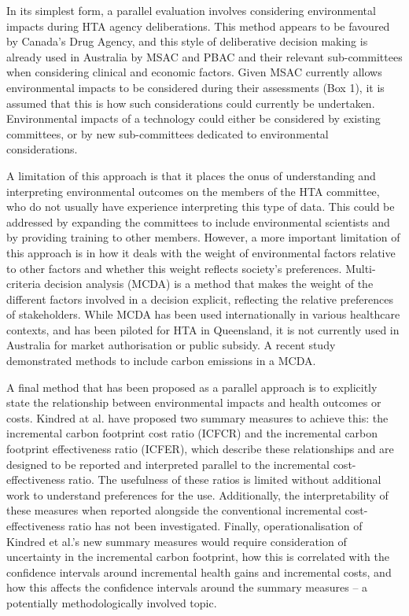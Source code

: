 \begin{refsection}
In its simplest form, a parallel evaluation involves considering environmental impacts during HTA agency deliberations. This method appears to be favoured by Canada’s Drug Agency,\cite{greenwood_dufour_how_2022} and this style of deliberative decision making is already used in Australia by MSAC and PBAC and their relevant sub-committees when considering clinical and economic factors. Given MSAC currently allows environmental impacts to be considered during their assessments (Box 1), it is assumed that this is how such considerations could currently be undertaken. Environmental impacts of a technology could either be considered by existing committees, or by new sub-committees dedicated to environmental considerations.

A limitation of this approach is that it places the onus of understanding and interpreting environmental outcomes on the members of the HTA committee, who do not usually have experience interpreting this type of data. This could be addressed by expanding the committees to include environmental scientists and by providing training to other members. However, a more important limitation of this approach is in how it deals with the weight of environmental factors relative to other factors and whether this weight reflects society’s preferences. Multi-criteria decision analysis (MCDA) is a method that makes the weight of the different factors involved in a decision explicit, reflecting the relative preferences of stakeholders. While MCDA has been used internationally in various healthcare contexts,\cite{thokala_multiple_2016, marsh_multiple_2016} and has been piloted for HTA in Queensland,\cite{howard_multicriteria_2018} it is not currently used in Australia for market authorisation or public subsidy. A recent study demonstrated methods to include carbon emissions in a MCDA.\cite{kingma_exploring_2025}

A final method that has been proposed as a parallel approach is to explicitly state the relationship between environmental impacts and health outcomes or costs.\cite{kindred_exploratory_2024} Kindred at al. have proposed two summary measures to achieve this: the incremental carbon footprint cost ratio (ICFCR) and the incremental carbon footprint effectiveness ratio (ICFER), which describe these relationships and are designed to be reported and interpreted parallel to the incremental cost-effectiveness ratio.\cite{kindred_exploratory_2024} The usefulness of these ratios is limited without additional work to understand preferences for the use. Additionally, the interpretability of these measures when reported alongside the conventional incremental cost-effectiveness ratio has not been investigated. Finally, operationalisation of Kindred et al.’s new summary measures would require consideration of uncertainty in the incremental carbon footprint, how this is correlated with the confidence intervals around incremental health gains and incremental costs, and how this affects the confidence intervals around the summary measures – a potentially methodologically involved topic. 


\end{refsection}
